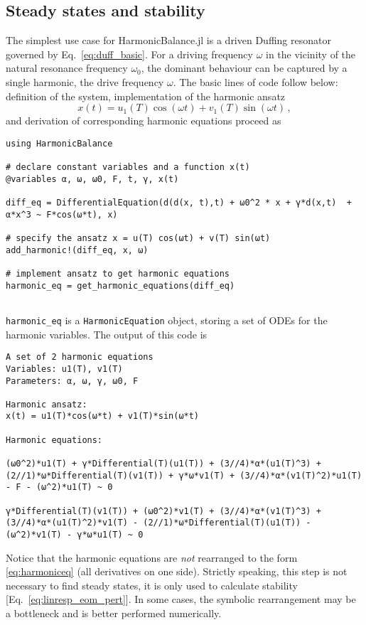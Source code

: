 \subsection{Steady states and stability} \label{sec:app_duffing_example}


The simplest use case for HarmonicBalance.jl is a driven Duffing resonator governed by Eq.~\eqref{eq:duff_basic}.
For a driving frequency $\omega$ in the vicinity of the natural resonance frequency $\omega_0$, the dominant behaviour can be captured by a single harmonic, the drive frequency $\omega$. The basic lines of code follow below: definition of the system, implementation of the harmonic ansatz 
%
\begin{equation}
x(t) = u_1(T) \cos(\omega t ) + v_1(T) \sin(\omega t)\,,
\end{equation}
and derivation of corresponding harmonic equations proceed as
%
\begin{lstlisting}[numbers=none]
using HarmonicBalance

# declare constant variables and a function x(t)
@variables α, ω, ω0, F, t, γ, x(t) 

diff_eq = DifferentialEquation(d(d(x, t),t) + ω0^2 * x + γ*d(x,t)  + α*x^3 ~ F*cos(ω*t), x)

# specify the ansatz x = u(T) cos(ωt) + v(T) sin(ωt) 
add_harmonic!(diff_eq, x, ω) 

# implement ansatz to get harmonic equations 
harmonic_eq = get_harmonic_equations(diff_eq)


\end{lstlisting}
%
\texttt{harmonic\_eq} is a \texttt{HarmonicEquation} object, storing a set of ODEs for the harmonic variables. The output of this code is
%
\begin{lstlisting}[numbers=none, basicstyle=\scriptsize\ttfamily]
A set of 2 harmonic equations
Variables: u1(T), v1(T)
Parameters: α, ω, γ, ω0, F

Harmonic ansatz: 
x(t) = u1(T)*cos(ω*t) + v1(T)*sin(ω*t)

Harmonic equations:

(ω0^2)*u1(T) + γ*Differential(T)(u1(T)) + (3//4)*α*(u1(T)^3) + (2//1)*ω*Differential(T)(v1(T)) + γ*ω*v1(T) + (3//4)*α*(v1(T)^2)*u1(T) - F - (ω^2)*u1(T) ~ 0

γ*Differential(T)(v1(T)) + (ω0^2)*v1(T) + (3//4)*α*(v1(T)^3) + (3//4)*α*(u1(T)^2)*v1(T) - (2//1)*ω*Differential(T)(u1(T)) - (ω^2)*v1(T) - γ*ω*u1(T) ~ 0
\end{lstlisting}
%
Notice that the harmonic equations are \textit{not} rearranged to the form \eqref{eq:harmoniceq} (all derivatives on one side). Strictly speaking, this step is not necessary to find steady states, it is only used to calculate stability [Eq.~\eqref{eq:linresp_eom_pert}]. In some cases, the symbolic rearrangement may be a bottleneck and is better performed numerically.

